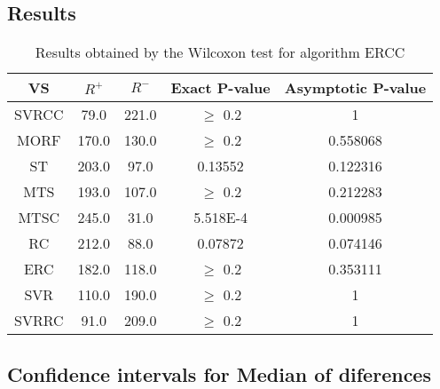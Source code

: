 \documentclass[a4paper,10pt]{article}
\begin{document}
\subsection{Results}

\begin{table}[!htp]
\centering\small
\begin{tabular}{
|c|c|c|c|c|}
\hline
 VS & $R^{+}$ & $R^{-}$ & Exact P-value & Asymptotic P-value \\ \hline 
SVRCC & 79.0 & 221.0 & $\geq$ 0.2 & 1\\ \hline 
MORF & 170.0 & 130.0 & $\geq$ 0.2 & 0.558068\\ \hline 
ST & 203.0 & 97.0 & 0.13552 & 0.122316\\ \hline 
MTS & 193.0 & 107.0 & $\geq$ 0.2 & 0.212283\\ \hline 
MTSC & 245.0 & 31.0 & 5.518E-4 & 0.000985\\ \hline 
RC & 212.0 & 88.0 & 0.07872 & 0.074146\\ \hline 
ERC & 182.0 & 118.0 & $\geq$ 0.2 & 0.353111\\ \hline 
SVR & 110.0 & 190.0 & $\geq$ 0.2 & 1\\ \hline 
SVRRC & 91.0 & 209.0 & $\geq$ 0.2 & 1\\ \hline 

\end{tabular}
\caption{Results obtained by the Wilcoxon test for algorithm ERCC}
\end{table}

\subsection{Confidence intervals for Median of diferences}
\end{document}
